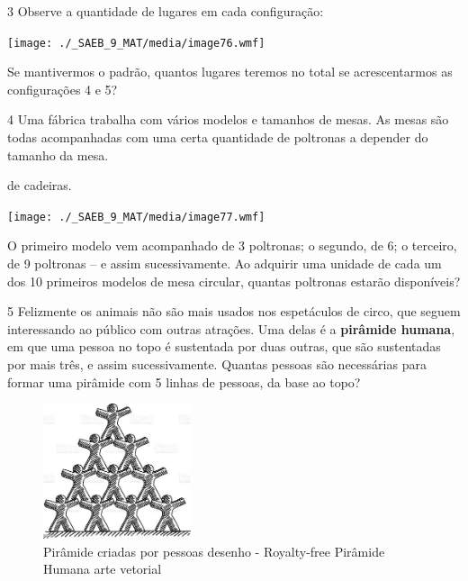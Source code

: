 {{{\begin{escolha}
{\num{3} Observe a quantidade de lugares em cada configuração:


\texttt{[image: ./\_SAEB\_9\_MAT/media/image76.wmf]}

Se mantivermos o padrão, quantos lugares teremos no total se
acrescentarmos as configurações 4 e 5?


\num{4} Uma fábrica trabalha com vários modelos e tamanhos de mesas. As mesas
são todas acompanhadas com uma certa quantidade de poltronas a depender
do tamanho da mesa.

de cadeiras.

\texttt{[image: ./\_SAEB\_9\_MAT/media/image77.wmf]}

O primeiro modelo vem acompanhado de 3 poltronas; o segundo, de 6; o 
terceiro, de 9 poltronas -- e assim sucessivamente. Ao adquirir uma
unidade de cada um dos 10 primeiros modelos de mesa circular, quantas
poltronas estarão disponíveis?


\num{5} Felizmente os animais não são mais usados nos espetáculos de circo,
que seguem interessando ao público com outras atrações. Uma delas é a 
\textbf{pirâmide humana}, em que uma pessoa no topo é sustentada por duas
outras, que são sustentadas por mais três, e assim sucessivamente. Quantas
pessoas são necessárias para formar uma pirâmide com 5 linhas de pessoas,
da base ao topo?

\begin{figure}
\centering
\includegraphics[width=1.71354in,height=1.56302in]{./_SAEB_9_MAT/media/image82.jpeg}
\caption{Pirâmide criadas por pessoas desenho - Royalty-free Pirâmide
Humana arte vetorial}
\end{figure}

}
\end{escolha}}}}
